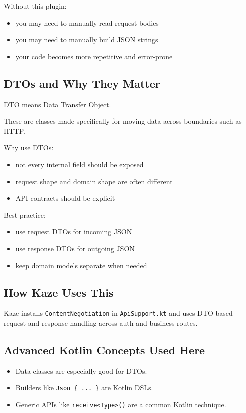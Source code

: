 \documentclass[11pt,a4paper]{article}
\begin{document}
Without this plugin:
\begin{itemize}
    \item you may need to manually read request bodies
    \item you may need to manually build JSON strings
    \item your code becomes more repetitive and error-prone
\end{itemize}

\subsection{DTOs and Why They Matter}

DTO means Data Transfer Object.

These are classes made specifically for moving data across boundaries such as HTTP.

Why use DTOs:
\begin{itemize}
    \item not every internal field should be exposed
    \item request shape and domain shape are often different
    \item API contracts should be explicit
\end{itemize}

Best practice:
\begin{itemize}
    \item use request DTOs for incoming JSON
    \item use response DTOs for outgoing JSON
    \item keep domain models separate when needed
\end{itemize}

\subsection{How Kaze Uses This}

Kaze installs \texttt{ContentNegotiation} in \texttt{ApiSupport.kt} and uses DTO-based request and response handling across auth and business routes.

\subsection{Advanced Kotlin Concepts Used Here}

\begin{itemize}
    \item Data classes are especially good for DTOs.
    \item Builders like \texttt{Json \{ ... \}} are Kotlin DSLs.
    \item Generic APIs like \texttt{receive<Type>()} are a common Kotlin technique.
\end{itemize}
\end{document}
